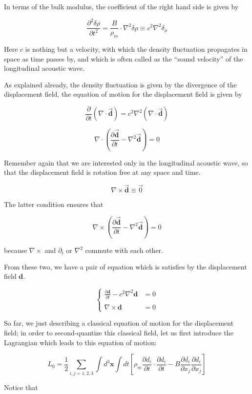 ﻿\documentclass[twoside]{book}
\numberwithin{equation}{section}
\begin{document}
In terms of the bulk modulus, the coefficient of the right hand side is given by 

\[\frac{\partial^2\delta\rho}{\partial t^2} = \frac{B}{\rho_m}\cdot\nabla^2\delta\rho \equiv c^2\nabla^2\delta_\rho \]

Here $c$ is nothing but a velocity, with which the density fluctuation propagates in space as time passes by, and which is often called as the ``sound velocity'' of the longitudinal acoustic wave. 

As explained already, the density fluctuation is given by the divergence of the displacement field, the equation of motion for the displacement field is given by 

\[\frac{\partial}{\partial t}(\nabla\cdot\vec{\bm{d}}) = c^2\nabla^2(\nabla\cdot\vec{\bm{d}}) \]

\[\nabla\cdot\left(\frac{\partial \vec{\bm{d}}}{\partial t} - \nabla^2\vec{\bm{d}}\right) = 0 \]

Remember again that we are interested only in the longitudinal acoustic wave, so that the displacement field is rotation free at any space and time. 

\[\nabla\times\vec{\bm{d}} \equiv\vec{0} \]

The latter condition ensures that

\[\nabla\times\left(\frac{\partial \vec{\bm{d}}}{\partial t} - \nabla^2\vec{\bm{d}}\right) = 0\]

because $\nabla\times$ and $\partial_t$ or $\nabla^2$ commute with each other. 

From these two, we have a pair of equation which is satisfies by the displacement field $\bm{d}$. 

\[\begin{cases}
\frac{\partial\bm{d}}{\partial t} - c^2\nabla^2\bm{d} &= 0\\
\ &\ \\
\nabla\times\bm{d} &= 0
\end{cases}\]

So far, we just describing a classical equation of motion for the displacement field; in order to second-quantize this classical field, let us first introduce the Lagrangian which leads to this equation of motion:

\[L_0 = \frac{1}{2}\sum_{i,j=1,2,3}\int d^3\bm{x}\int dt\left[\rho_m\frac{\partial d_i}{\partial t}\cdot\frac{\partial d_i}{\partial t} - B\frac{\partial d_i}{\partial x_j}\frac{\partial d_i}{\partial x_j}\right]\]

Notice that
\end{document}
